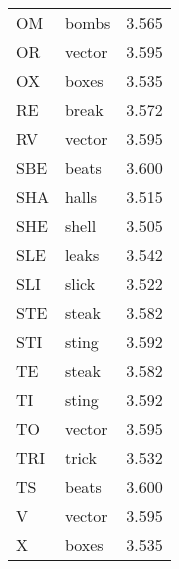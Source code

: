 \documentclass[11pt]{article}
\begin{document}
\begin{multicols}{3}
\begin{tabular}{|l|l|l|}
OM & bombs & 3.565 \\
OR & vector & 3.595 \\
OX & boxes & 3.535 \\
RE & break & 3.572 \\
RV & vector & 3.595 \\
SBE & beats & 3.600 \\
SHA & halls & 3.515 \\
SHE & shell & 3.505 \\
SLE & leaks & 3.542 \\
SLI & slick & 3.522 \\
STE & steak & 3.582 \\
STI & sting & 3.592 \\
TE & steak & 3.582 \\
TI & sting & 3.592 \\
TO & vector & 3.595 \\
TRI & trick & 3.532 \\
TS & beats & 3.600 \\
V & vector & 3.595 \\
X & boxes & 3.535 \\
\hline
\end{tabular}


\end{multicols}
\end{document}

